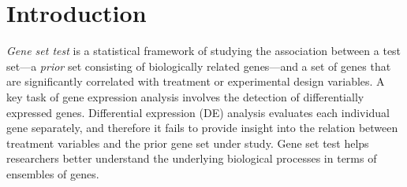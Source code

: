 \documentclass[a4,center,fleqn]{NAR}
\begin{document}
%	
%	
	
	\section{Introduction}\label{section:introduction}
	
	\textit{Gene set test} is a statistical framework of studying the association between a test
	set---a \textit{prior} set consisting of biologically related genes---and a set of genes that are
	significantly correlated with treatment or experimental design variables. A key task of gene
	expression analysis involves the detection of differentially expressed genes. Differential
	expression (DE) analysis  evaluates each individual gene separately, and therefore it fails to
	provide insight into the relation between treatment variables and the prior gene set under study.
	Gene set test helps researchers better understand the underlying biological processes in terms of
	ensembles of genes.
	
\end{document}

